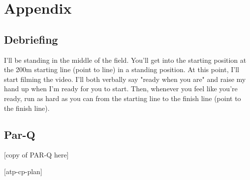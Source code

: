 \documentclass[index]{subfiles}
\begin{document}
\section{Appendix}
\subsection{Debriefing}
I'll be standing in the middle of the field. You'll get into the starting position at the 200m starting line (point to line) in a standing position. At this point, I'll start filming the video. I'll both verbally say "ready when you are" and raise my hand up when I'm ready for you to start. Then, whenever you feel like you're ready, run as hard as you can from the starting line to the finish line (point to the finish line).
\subsection{Par-Q}
[copy of PAR-Q here]

[atp-cp-plan]

\raggedright{}
\printbibliography[heading=bibintoc]
\end{document}
